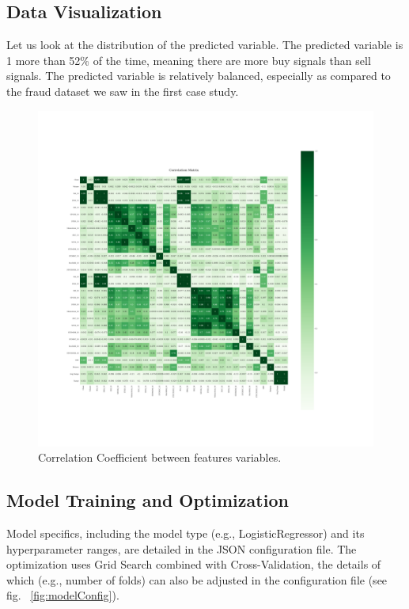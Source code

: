\subsection{Data Visualization}
Let us look at the distribution of the predicted variable. The predicted variable is 1 more than 52\% of the time, meaning there are more buy
signals than sell signals. The predicted variable is relatively balanced, especially as
compared to the fraud dataset we saw in the first case study.


\begin{figure}[H]
\centering
\begin{adjustbox}{max width=1.2\textwidth,center}
    \includegraphics[scale=1.2, trim={30mm 70mm 50mm 110mm}, clip]{./pdf/correlation_matrix.pdf}
\end{adjustbox}
\caption{Correlation Coefficient between features variables.}
\label{fig:corr_coef}
\end{figure}


\subsection{Model Training and Optimization}
Model specifics, including the model type (e.g., LogisticRegressor) and its hyperparameter ranges, are detailed in the JSON configuration file. The optimization uses Grid Search combined with Cross-Validation, the details of which (e.g., number of folds) can also be adjusted in the configuration file (see fig. ~\ref{fig:modelConfig}).

